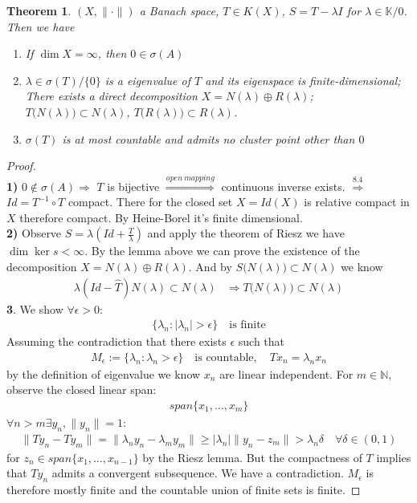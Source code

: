 \documentclass[a4paper,11pt,fleqn]{book}
\newtheorem{theorem}{Theorem}[section]
\theoremstyle{definition}
\theoremstyle{remark}
\begin{document}
\begin{theorem}
	$(X, \|\cdot\|)$ a Banach space, $T \in K(X)$, $S = T - \lambda I$ for $\lambda \in \mathbb{K} \slash 0$. Then we have
	\begin{enumerate}
		\item If $\dim X = \infty$, then $0 \in \sigma(A)$
		\item $\lambda \in \sigma (T)\slash \{0\}$ is a eigenvalue of $T$ and its eigenspace is finite-dimensional; There exists a direct decomposition $X = N(\lambda) \oplus R(\lambda)$; $T\big(N(\lambda)\big) \subset N(\lambda)$, $T\big(R(\lambda)\big) \subset R(\lambda)$.
		\item $\sigma(T)$ is at most countable and admits no cluster point other than $0$
	\end{enumerate}
\end{theorem}
\begin{proof}\quad\\
\textbf{1)}	$0 \notin \sigma(A) \Rightarrow$ $T$ is bijective
	 $\overset{open\ mapping}{\Rightarrow}$ continuous inverse exists. 
	 $\overset{8.4}{\Rightarrow}$	$Id= T^{-1} \circ T$ compact. There for the closed set $X = Id(X)$ is relative compact in $X$ therefore compact. By Heine-Borel it's finite dimensional.\\
\textbf{2)}
Observe $S = \lambda(Id + \frac{T}{\lambda})$ and apply the theorem of Riesz we have $\dim \ker s < \infty$. By the lemma above we can prove the existence of the decomposition $X = N(\lambda) \oplus R(\lambda)$.  And by $S\big(N(\lambda)\big) \subset N(\lambda)$ we know
\begin{align*}
	\lambda(Id - \hat{T})N(\lambda) \subset N(\lambda) & \Rightarrow T\big(N(\lambda)\big) \subset N(\lambda)
\end{align*}
\textbf{3}. We show $\forall \epsilon > 0$:
\begin{align*}
	\{\lambda_n : |\lambda_n| > \epsilon \} \quad \text{is finite}
\end{align*}
Assuming the contradiction that there exists $\epsilon$ such that 
\begin{align*}
	M_\epsilon := \{\lambda_n: \lambda_n > \epsilon\} \quad \text{is countable}, \quad Tx_n = \lambda_n x_n
\end{align*}
by the definition of eigenvalue we know $x_n$ are linear independent. For $m \in \mathbb{N}$, observe the closed linear span:
\begin{align*}
	span\{x_1, \dots, x_m\}
\end{align*}
$\forall n > m \exists y_n, \|y_n\| = 1: $ 
\begin{align*}
	\|Ty_n - Ty_m\| = \|\lambda_n y_n - \lambda_m y_m\| \geq |\lambda_n|\|y_n - z_m\| > \lambda_n \delta \quad \forall \delta \in (0, 1)
\end{align*}
for $z_n \in span\{x_1, \dots, x_{n-1}\}$ by the Riesz lemma. But the compactness of $T$ implies that $Ty_n$ admits a convergent subsequence. We have a contradiction. $M_\epsilon$ is therefore mostly finite and the countable union of finite sets is finite.
\end{proof}
\end{document}
